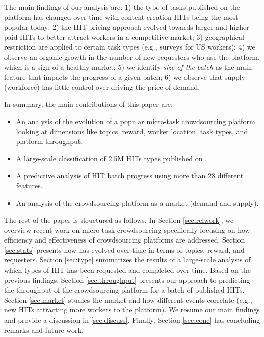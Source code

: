 The main findings of our analysis are: 1) the type of tasks published on the platform has changed over time with content creation HITs being the most popular today; 2) the HIT pricing approach evolved towards larger and higher paid HITs to better attract workers in a competitive market; 3) geographical restriction are applied to certain task types (e.g., surveys for US workers); 4) we observe an organic growth in the number of new requesters who use the platform, which is a sign of a healthy market; 5) we identify \emph{size of the batch} as the main feature that impacts the progress of a given batch; 6) we observe that supply (workforce) has little control over driving the price of demand.

In summary, the main contributions of this paper are:
\begin{itemize}[noitemsep,topsep=0pt,parsep=0pt,partopsep=0pt]

	\item An analysis of the evolution of a popular micro-task crowdsourcing platform looking at dimensions like topics, reward, worker location, task types, and platform throughput.

	\item A large-scale classification of 2.5M HITs types published on \amt{}.

	\item A predictive analysis of HIT batch progress using more than 28 different features.
	
	\item An analysis of the crowdsourcing platform as a market (demand and supply).
	
\end{itemize}


The rest of the paper is structured as follows.
In Section \ref{sec:relwork}, we overview recent work on micro-task crowdsourcing specifically focusing on how  efficiency and effectiveness  of crowdsourcing platforms are addressed.
Section \ref{sec:stats} presents how \amt{} has evolved over time in terms of topics, reward, and requesters.
Section \ref{sec:type} summarizes the results of a large-scale analysis of which types of HIT has been requested and completed over time.
Based on the previous findings, Section \ref{sec:throughput} presents our approach to predicting the throughput of the crowdsourcing platform for a batch of published HITs.
Section \ref{sec:market} studies the \amt{} market and how different events correlate (e.g., new HITs attracting more workers to the platform).
We resume our main findings and provide a discussion in \ref{sec:discuss}. 
Finally, Section \ref{sec:conc} has concluding remarks and future work.

